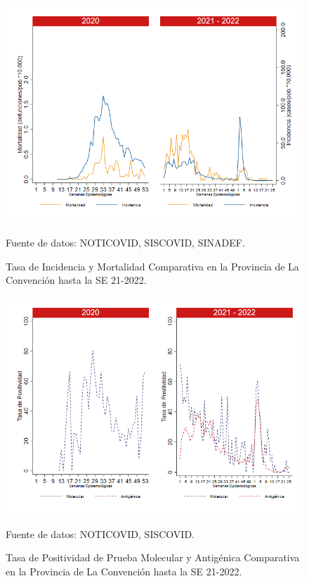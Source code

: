 \documentclass[12pt,a4paper,openany]{book}
\begin{document}
	\begin{figure}[h]
		\caption{Tasa de Incidencia y Mortalidad Comparativa en la Provincia de La Convención hasta la SE 21-2022.}\label{fig:inc_mort_laconv}
		\begin{center}
			\includegraphics[width=0.85\linewidth]{../figuras/incidencia_mortalidad_20_21_9.png}
		\end{center}
		{\footnotesize {Fuente de datos: NOTICOVID, SISCOVID, SINADEF.}}
	\end{figure}
	
	\begin{figure}[h]
		\caption{Tasa de Positividad de Prueba Molecular y Antigénica Comparativa en la Provincia de La Convención hasta la SE 21-2022.}\label{fig:positividad_laconv}
		\begin{center}
			\includegraphics[width=0.7\linewidth]{../figuras/positividad_20_21_9.png}
		\end{center}
		{\footnotesize {Fuente de datos: NOTICOVID, SISCOVID.}}
	\end{figure}
	
\end{document}
